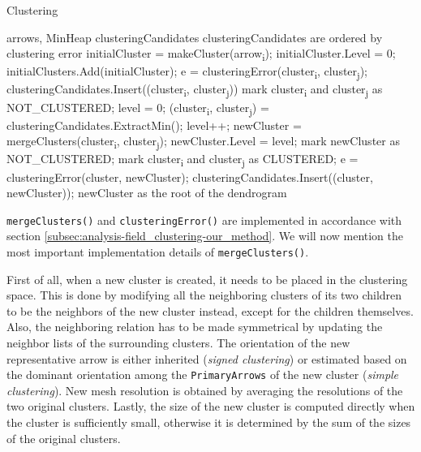 \begin{algorithm}[H]
\caption{Clustering}
\label{algo:clustering}
\begin{algorithmic}[1]

\Require arrows, MinHeap clusteringCandidates \Comment clusteringCandidates are ordered by clustering error
\Statex
{}
	\State initialCluster = makeCluster(arrow\textsubscript{i});
    \State initialCluster.Level = 0;
    \State initialClusters.Add(initialCluster);
\EndFor
\Statex
{}
    	\State e = clusteringError(cluster\textsubscript{i}, cluster\textsubscript{j});
        \State clusteringCandidates.Insert((cluster\textsubscript{i}, cluster\textsubscript{j}))
        \State mark cluster\textsubscript{i} and cluster\textsubscript{j} as NOT\_CLUSTERED;
    \EndFor
\EndFor
\Statex
\State level = 0;
	\State (cluster\textsubscript{i}, cluster\textsubscript{j}) = clusteringCandidates.ExtractMin();
    	\State level++;
    	\State newCluster = mergeClusters(cluster\textsubscript{i}, cluster\textsubscript{j});
        \State newCluster.Level = level;
		\State mark newCluster as NOT\_CLUSTERED;
        \State mark cluster\textsubscript{i} and cluster\textsubscript{j} as CLUSTERED;
        	\State e = clusteringError(cluster, newCluster);
            \State clusteringCandidates.Insert((cluster, newCluster));
        \EndFor
    \EndIf
\EndWhile
\Statex
\Return newCluster as the root of the dendrogram
\end{algorithmic}
\end{algorithm}

\verb+mergeClusters()+ and \verb+clusteringError()+ are implemented in accordance with section \ref{subsec:analysis-field_clustering-our_method}. We will now mention the most important implementation details of \verb+mergeClusters()+.

First of all, when a new cluster is created, it needs to be placed in the clustering space. This is done by modifying all the neighboring clusters of its two children to be the neighbors of the new cluster instead, except for the children themselves. Also, the neighboring relation has to be made symmetrical by updating the neighbor lists of the surrounding clusters. The orientation of the new representative arrow is either inherited ({\it signed clustering}) or estimated based on the dominant orientation among the \verb+PrimaryArrows+ of the new cluster ({\it simple clustering}). New mesh resolution is obtained by averaging the resolutions of the two original clusters. Lastly, the size of the new cluster is computed directly when the cluster is sufficiently small, otherwise it is determined by the sum of the sizes of the original clusters.

